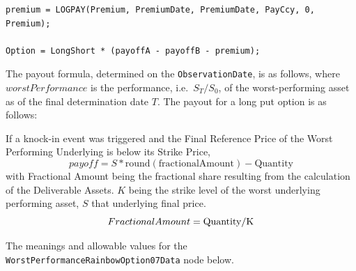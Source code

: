 \begin{listing}[hbt]
\begin{verbatim}
premium = LOGPAY(Premium, PremiumDate, PremiumDate, PayCcy, 0, Premium);

Option = LongShort * (payoffA - payoffB - premium);
\end{verbatim}
\caption{Payoff script for a WorstPerformanceRainbowOption07.}
\label{lst:worst_performance_rainbow_option_07}
\end{listing}

The payout formula, determined on the \lstinline!ObservationDate!, is as follows, where
$worstPerformance$ is the performance, i.e.\ $S_T/S_0$, of the worst-performing asset as
of the final determination date $T$. The payout for a long put option is as follows:

If a knock-in event was triggered and the Final Reference Price of the Worst Performing Underlying
is below its Strike Price,
\begin{equation*}
  payoff = S * \text{round}(\text{fractionalAmount}) - \text{Quantity}
\end{equation*}
with Fractional Amount being the fractional share resulting from the calculation of the Deliverable Assets. $K$ being the strike level of the 
worst underlying performing asset, $S$ that underlying final price.
\begin{equation*}
  FractionalAmount = \text{\lstinline!Quantity!} / \text{K}
\end{equation*}

The meanings and allowable values for the \lstinline!WorstPerformanceRainbowOption07Data! node below.

